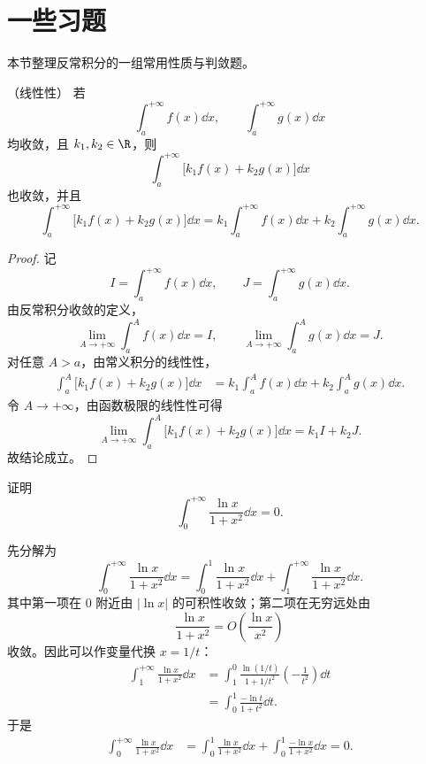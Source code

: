 \section{一些习题}
本节整理反常积分的一组常用性质与判敛题。

\begin{proposition}（线性性）
	若
	\[
	\int_a^{+\infty} f(x)\dd x,
	\qquad
	\int_a^{+\infty} g(x)\dd x
	\]
	均收敛，且 $k_1,k_2\in\R$，则
	\[
	\int_a^{+\infty}\bigl[k_1f(x)+k_2g(x)\bigr]\dd x
	\]
	也收敛，并且
	\[
	\int_a^{+\infty}\bigl[k_1f(x)+k_2g(x)\bigr]\dd x
	=k_1\int_a^{+\infty} f(x)\dd x
	+k_2\int_a^{+\infty} g(x)\dd x.
	\]
\end{proposition}

\begin{proof}
	记
	\[
	I=\int_a^{+\infty}f(x)\dd x,
	\qquad
	J=\int_a^{+\infty}g(x)\dd x.
	\]
	由反常积分收敛的定义，
	\[
	\lim_{A\to+\infty}\int_a^A f(x)\dd x=I,
	\qquad
	\lim_{A\to+\infty}\int_a^A g(x)\dd x=J.
	\]
	对任意 $A>a$，由常义积分的线性性，
	\[
	\begin{aligned}
		\int_a^A\bigl[k_1f(x)+k_2g(x)\bigr]\dd x
		&=k_1\int_a^A f(x)\dd x+k_2\int_a^A g(x)\dd x.
	\end{aligned}
	\]
	令 $A\to+\infty$，由函数极限的线性性可得
	\[
	\lim_{A\to+\infty}\int_a^A\bigl[k_1f(x)+k_2g(x)\bigr]\dd x
	=k_1I+k_2J.
	\]
	故结论成立。
\end{proof}

\begin{example}
	证明
	\[
	\int_0^{+\infty}\frac{\ln x}{1+x^2}\dd x=0.
	\]
\end{example}

\begin{solution}
	先分解为
	\[
	\int_0^{+\infty}\frac{\ln x}{1+x^2}\dd x
	=\int_0^1\frac{\ln x}{1+x^2}\dd x
	+\int_1^{+\infty}\frac{\ln x}{1+x^2}\dd x.
	\]
	其中第一项在 $0$ 附近由 $|\ln x|$ 的可积性收敛；第二项在无穷远处由
	\[
	\frac{\ln x}{1+x^2}=O\left(\frac{\ln x}{x^2}\right)
	\]
	收敛。因此可以作变量代换 $x=1/t$：
	\[
	\begin{aligned}
		\int_1^{+\infty}\frac{\ln x}{1+x^2}\dd x
		&=\int_1^0\frac{\ln(1/t)}{1+1/t^2}\left(-\frac1{t^2}\right)\dd t  \\
		&=\int_0^1\frac{-\ln t}{1+t^2}\dd t.
	\end{aligned}
	\]
	于是
	\[
	\begin{aligned}
		\int_0^{+\infty}\frac{\ln x}{1+x^2}\dd x
		&=\int_0^1\frac{\ln x}{1+x^2}\dd x
		+\int_0^1\frac{-\ln x}{1+x^2}\dd x=0.
	\end{aligned}
	\]
\end{solution}

